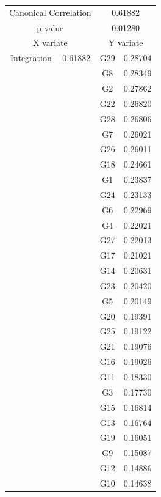 \begin{figure}
  \begin{subfigure}{.65\textwidth}
  \centering
  \begin{tabular}{ c c | c c }
    \multicolumn{2}{c}{Canonical Correlation} &  \multicolumn{2}{c}{0.61882} \\
    \multicolumn{2}{c}{p-value} &  \multicolumn{2}{c}{0.01280} \\
    \hline
    \multicolumn{2}{c}{X variate} & \multicolumn{2}{c}{Y variate}\\
    \hline
  Integration & 0.61882 &  G29 & 0.28704\\
  & &  G8 & 0.28349\\
  & &  G2 & 0.27862\\
  & &  G22 & 0.26820\\
  & &  G28 & 0.26806\\
  & &  G7 & 0.26021\\
  & &  G26 & 0.26011\\
  & &  G18 & 0.24661\\
  & &  G1 & 0.23837\\
  & &  G24 & 0.23133\\
  & &  G6 & 0.22969\\
  & &  G4 & 0.22021\\
  & &  G27 & 0.22013\\
  & &  G17 & 0.21021\\
  & &  G14 & 0.20631\\
  & &  G23 & 0.20420\\
  & &  G5 & 0.20149\\
  & &  G20 & 0.19391\\
  & &  G25 & 0.19122\\
  & &  G21 & 0.19076\\
  & &  G16 & 0.19026\\
  & &  G11 & 0.18330\\
  & &  G3 & 0.17730\\
  & &  G15 & 0.16814\\
  & &  G13 & 0.16764\\
  & &  G19 & 0.16051\\
  & &  G9 & 0.15087\\
  & &  G12 & 0.14886\\
  & &  G10 & 0.14638\\
  \end{tabular}

  \end{subfigure}
  \begin{subfigure}{.25\textwidth}
    \centering 
    

\end{subfigure}
\end{figure}
